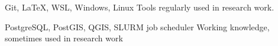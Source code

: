 
\begin{cvskills}

  \cvskill
    {\faCircle \faCircle \faCircle \faCircle \faCircleThin} %
    {Git, \LaTeX, WSL, Windows, Linux} %
    {Tools regularly used in research work.} %

  \cvskill
    {\faCircle \faCircle \faCircle \faCircleThin \faCircleThin} %
    {PostgreSQL, PostGIS, QGIS, SLURM job scheduler} %
    {Working knowledge, sometimes used in research work} %

\end{cvskills}
